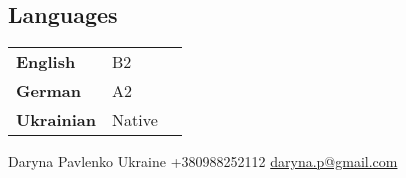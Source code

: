 \documentclass[lighthipster]{simplehipstercv}
\newlength{\rightcolwidth}
\begin{document}
\begin{paracol}{2}
\begin{minipage}[t]{0.3\textwidth}
\section*{Languages}
\begin{tabular}{l | ll}
\textbf{English} & B2  \\
\textbf{German} & A2  \\
\textbf{Ukrainian} & Native  \\
\end{tabular}
\bigskip

\end{minipage}\hfill






\vfill{} %

\setlength{\parindent}{0pt}
\begin{minipage}[t]{\rightcolwidth}
\begin{center}\fontfamily{\sfdefault}\selectfont \color{black!70}
{\small  {} Daryna Pavlenko  Ukraine   +380988252112 \newline{} \protect\url{daryna.p@gmail.com}
}
\end{center}
\end{minipage}

\end{paracol}
\end{document}
